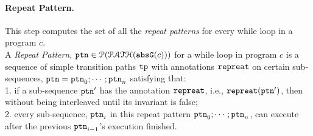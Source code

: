 \paragraph{Repeat Pattern.} This step computes the set of all the \emph{repeat patterns} for every while loop in a program $c$.
\\
  A \emph{Repeat Pattern},
  $\mathtt{ptn} \in \mathcal{P}(\mathcal{PATH}({\mathtt{abs}{\mathtt{G}}(c)}))$ for a while loop in program $c$ is
a sequence of simple transition paths $\mathtt{tp}$ with annotations $\mathtt{repreat}$ on certain sub-sequences,
$\mathtt{ptn} = \mathtt{ptn}_0; \cdots; \mathtt{ptn}_n$
satisfying that:
\\
1. if a sub-sequence $\mathtt{ptn}'$ has the annotation $\mathtt{repreat}$, i.e., $\mathtt{repreat}(\mathtt{ptn}')$,
then  without being interleaved until its invariant is false;
\\
2. every sub-sequence, $\mathtt{ptn}_i$ in this repeat pattern $\mathtt{ptn}_0; \cdots; \mathtt{ptn}_n$,
can execute
after the previous $\mathtt{ptn}_{i - 1}$'s execution finished.
